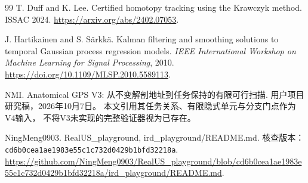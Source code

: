 \documentclass[UTF8,11pt,a4paper,fontset=fandol]{ctexart}
\numberwithin{equation}{section}
\theoremstyle{definition}
\begin{document}
\begin{thebibliography}{99}
T. Duff and K. Lee.
Certified homotopy tracking using the Krawczyk method.
ISSAC 2024.
\url{https://arxiv.org/abs/2402.07053}.

J. Hartikainen and S. Särkkä.
Kalman filtering and smoothing solutions to temporal Gaussian process regression models.
\emph{IEEE International Workshop on Machine Learning for Signal Processing}, 2010.
\url{https://doi.org/10.1109/MLSP.2010.5589113}.

NMI.
Anatomical GPS V3: 从不变解剖地址到任务保持的有限可行扫描.
用户项目研究稿，2026年10月7日。
本文引用其任务关系、有限隐式单元与分支门点作为V4输入，
不将V3未实现的完整验证器视为已存在。

NingMeng0903.
RealUS\_playground, ird\_playground/README.md.
核查版本：
\texttt{cd6b0cea1ae1983e55c1c732d0429b1bfd32218a}.
\url{https://github.com/NingMeng0903/RealUS_playground/blob/cd6b0cea1ae1983e55c1c732d0429b1bfd32218a/ird_playground/README.md}.

\end{thebibliography}
\end{document}
